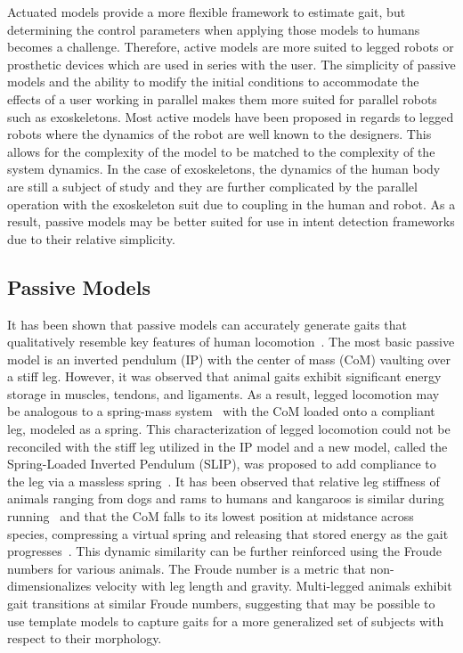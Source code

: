 Actuated models provide a more flexible framework to estimate gait, but determining the control parameters when applying those models to humans becomes a challenge. Therefore, active models are more suited to legged robots or prosthetic devices which are used in series with the user. The simplicity of passive models and the ability to modify the initial conditions to accommodate the effects of a user working in parallel makes them more suited for parallel robots such as exoskeletons. Most active models have been proposed in regards to legged robots where the dynamics of the robot are well known to the designers. This allows for the complexity of the model to be matched to the complexity of the system dynamics. In the case of exoskeletons, the dynamics of the human body are still a subject of study and they are further complicated by the parallel operation with the exoskeleton suit due to coupling in the human and robot. As a result, passive models may be better suited for use in intent detection frameworks due to their relative simplicity.

\subsection{Passive Models}

It has been shown that passive models can accurately generate gaits that qualitatively resemble key features of human locomotion~\cite{mochon1980ballistic}. The most basic passive model is an inverted pendulum (IP) with the center of mass (CoM) vaulting over a stiff leg. However, it was observed that animal gaits exhibit significant energy storage in muscles, tendons, and ligaments. As a result, legged locomotion may be analogous to a spring-mass system~\cite{blickhan1989spring} with the CoM loaded onto a compliant leg, modeled as a spring. This characterization of legged locomotion could not be reconciled with the stiff leg utilized in the IP model and a new model, called the Spring-Loaded Inverted Pendulum (SLIP), was proposed to add compliance to the leg via a massless spring~\cite{blickhan1989spring}. It has been observed that relative leg stiffness of animals ranging from dogs and rams to humans and kangaroos is similar during running~\cite{blickhan1993similarity} and that the CoM falls to its lowest position at midstance across species, compressing a virtual spring and releasing that stored energy as the gait progresses~\cite{full1999templates}. This dynamic similarity can be further reinforced using the Froude numbers for various animals. The Froude number is a metric that non-dimensionalizes velocity with leg length and gravity. Multi-legged animals exhibit gait transitions at similar Froude numbers, suggesting that may be possible to use template models to capture gaits for a more generalized set of subjects with respect to their morphology.

